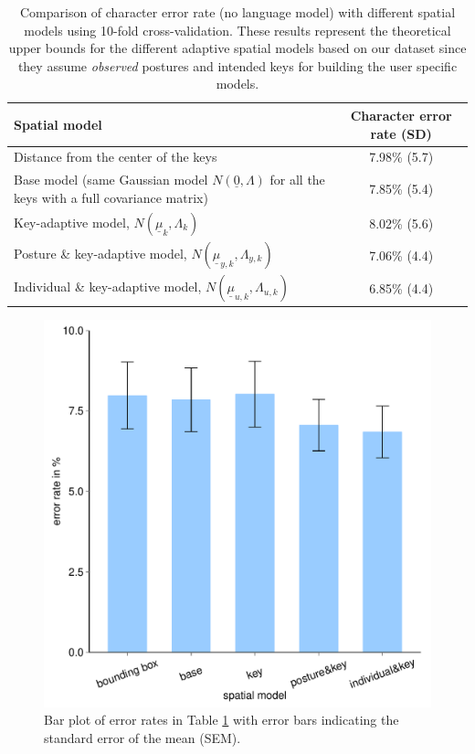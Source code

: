 \documentclass{sigchi}
\newcommand\tabhead[1]{\small\textbf{#1}}
\begin{document}
\begin{table} [tb]
 \centering
 \begin{tabular}{|l|c|}
   \hline
   \tabhead{Spatial model} &
   \multicolumn{1}{|p{0.2\columnwidth}|}{\centering\tabhead{Character
   error rate (SD)}} \\
   \hline
   Distance from the center of the keys & 7.98\% (5.7) \\
   \hline
   \multicolumn{1}{|p{0.7\columnwidth}|}{Base model (same Gaussian model $N(\underline 0, \Lambda)$ for
   all the keys with a full covariance matrix)} & 7.85\% (5.4) \\
   \hline
   \multicolumn{1}{|p{0.7\columnwidth}|}{Key-adaptive model, $N(\underline
   \mu_k, \Lambda_k)$} & 8.02\% (5.6) \\
   \hline
   \multicolumn{1}{|p{0.7\columnwidth}|}{Posture \& key-adaptive model,
   $N(\underline \mu_{y,k}, \Lambda_{y,k})$} & 7.06\% (4.4) \\
   \hline
    \multicolumn{1}{|p{0.7\columnwidth}|}{Individual \& key-adaptive model,
    $N(\underline \mu_{u,k}, \Lambda_{u,k})$} & 6.85\% (4.4) \\
   \hline
 \end{tabular}
 \caption{Comparison of character error rate (no language model) with
 different spatial models using 10-fold cross-validation. These results represent the theoretical upper bounds for the different adaptive spatial models based on our dataset since they assume \textit{observed} postures and intended keys for building the user specific models.}
 \label{tab:comparison}
\end{table}

\begin{figure}[tb]
 \centering
 \includegraphics[width=0.8\columnwidth,
 height=0.6\columnwidth]{figures/error-rates.pdf}
 \caption{Bar plot of error rates in Table \ref{tab:comparison} with error bars
 indicating the standard error of the mean (SEM).}
 \label{fig:error-bar1}
\end{figure}
\end{document}
